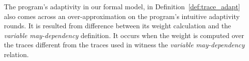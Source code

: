 \begin{example}
    \label{ex:multipleRoundSingle}
    The program's adaptivity in our formal model,
    in Definition~\ref{def:trace_adapt} also
     comes across an over-approximation on the program's
     intuitive adaptivity rounds.
    It is resulted from difference between its weight calculation and the \emph{variable may-dependency} definition.
    It occurs when the weight is computed over the traces different from the traces used in 
    witness the \emph{variable may-dependency} relation.
    

\end{example}
